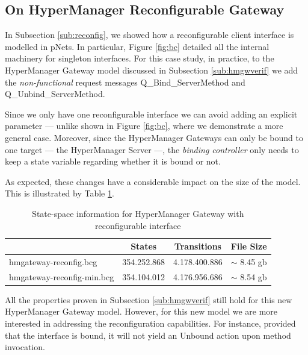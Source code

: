 \subsection{On HyperManager Reconfigurable Gateway}
\label{sub:hmrgwverif}	
	
			
	  In Subsection \ref{sub:reconfig}, we showed how a reconfigurable client interface is modelled
	  in pNets. In particular, Figure \ref{fig:bc} detailed all the internal machinery for singleton interfaces.			
	  For this case study, in practice, to the 
	  \textsf{HyperManager Gateway} model discussed in Subsection \ref{sub:hmgwverif} we add the \textit{non-functional}
      request messages \textsf{Q\_Bind\_ServerMethod} and \textsf{Q\_Unbind\_ServerMethod}. 
		
				
		Since we		
		only have one reconfigurable interface we can avoid adding an explicit parameter ---
		unlike shown in Figure \ref{fig:bc}, where we demonstrate a more general case. Moreover, since the 
		\textsf{HyperManager Gateway}s can only be bound to one target --- the \textsf{HyperManager Server} ---,
		the \textit{binding controller} only needs to keep a state variable regarding whether it is bound or not.
		

	  As expected, these changes have a considerable impact on the size of the model. This is illustrated by Table \ref{tab:modelG2}.
	  
	  
\begin{table}[ht]
\begin{center}
\begin{tabular}{| l | c | c | c |}
\hline
                             &  \textbf{States} & \textbf{Transitions} & \textbf{File Size} \\
\hline
  \textsf{hmgateway-reconfig.bcg}                                &  354.252.868  &  4.178.400.886  &   $\sim$ 8.45 gb\\
  \textsf{hmgateway-reconfig-min.bcg}  &  354.104.012  &  4.176.956.686  &    $\sim$ 8.54 gb\\
  \hline
\end{tabular}
\end{center}
\caption{State-space information for \textsf{HyperManager Gateway} with reconfigurable interface}
\label{tab:modelG2}
\end{table}


	All the properties proven in Subsection \ref{sub:hmgwverif} still hold for this new \textsf{HyperManager Gateway} 
	model.  However, for this new model we are more interested in addressing the reconfiguration
	capabilities. 
	For instance, provided that the interface is bound, it will not yield an \textsf{Unbound} action upon method invocation.	
	

